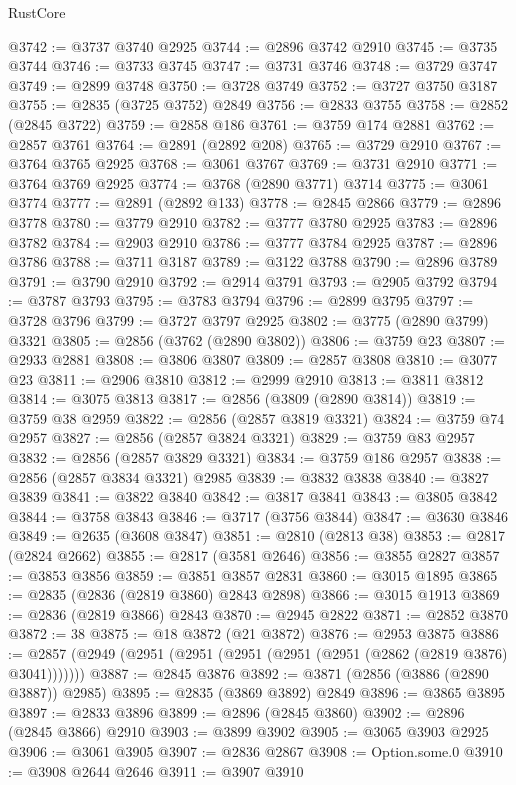 \begin{lexlean}{RustCore}
\begin{coremodule}
@3742 := @3737 @3740 @2925
@3744 := @2896 @3742 @2910
@3745 := @3735 @3744
@3746 := @3733 @3745
@3747 := @3731 @3746
@3748 := @3729 @3747
@3749 := @2899 @3748
@3750 := @3728 @3749
@3752 := @3727 @3750 @3187
@3755 := @2835 (@3725 @3752) @2849
@3756 := @2833 @3755
@3758 := @2852 (@2845 @3722)
@3759 := @2858 @186
@3761 := @3759 @174 @2881
@3762 := @2857 @3761
@3764 := @2891 (@2892 @208)
@3765 := @3729 @2910
@3767 := @3764 @3765 @2925
@3768 := @3061 @3767
@3769 := @3731 @2910
@3771 := @3764 @3769 @2925
@3774 := @3768 (@2890 @3771) @3714
@3775 := @3061 @3774
@3777 := @2891 (@2892 @133)
@3778 := @2845 @2866
@3779 := @2896 @3778
@3780 := @3779 @2910
@3782 := @3777 @3780 @2925
@3783 := @2896 @3782
@3784 := @2903 @2910
@3786 := @3777 @3784 @2925
@3787 := @2896 @3786
@3788 := @3711 @3187
@3789 := @3122 @3788
@3790 := @2896 @3789
@3791 := @3790 @2910
@3792 := @2914 @3791
@3793 := @2905 @3792
@3794 := @3787 @3793
@3795 := @3783 @3794
@3796 := @2899 @3795
@3797 := @3728 @3796
@3799 := @3727 @3797 @2925
@3802 := @3775 (@2890 @3799) @3321
@3805 := @2856 (@3762 (@2890 @3802))
@3806 := @3759 @23
@3807 := @2933 @2881
@3808 := @3806 @3807
@3809 := @2857 @3808
@3810 := @3077 @23
@3811 := @2906 @3810
@3812 := @2999 @2910
@3813 := @3811 @3812
@3814 := @3075 @3813
@3817 := @2856 (@3809 (@2890 @3814))
@3819 := @3759 @38 @2959
@3822 := @2856 (@2857 @3819 @3321)
@3824 := @3759 @74 @2957
@3827 := @2856 (@2857 @3824 @3321)
@3829 := @3759 @83 @2957
@3832 := @2856 (@2857 @3829 @3321)
@3834 := @3759 @186 @2957
@3838 := @2856 (@2857 @3834 @3321) @2985
@3839 := @3832 @3838
@3840 := @3827 @3839
@3841 := @3822 @3840
@3842 := @3817 @3841
@3843 := @3805 @3842
@3844 := @3758 @3843
@3846 := @3717 (@3756 @3844)
@3847 := @3630 @3846
@3849 := @2635 (@3608 @3847)
@3851 := @2810 (@2813 @38)
@3853 := @2817 (@2824 @2662)
@3855 := @2817 (@3581 @2646)
@3856 := @3855 @2827
@3857 := @3853 @3856
@3859 := @3851 @3857 @2831
@3860 := @3015 @1895
@3865 := @2835 (@2836 (@2819 @3860) @2843 @2898)
@3866 := @3015 @1913
@3869 := @2836 (@2819 @3866) @2843
@3870 := @2945 @2822
@3871 := @2852 @3870
@3872 := 38
@3875 := @18 @3872 (@21 @3872)
@3876 := @2953 @3875
@3886 := @2857 (@2949 (@2951 (@2951 (@2951 (@2951 (@2951 (@2862 (@2819 @3876) @3041)))))))
@3887 := @2845 @3876
@3892 := @3871 (@2856 (@3886 (@2890 @3887)) @2985)
@3895 := @2835 (@3869 @3892) @2849
@3896 := @3865 @3895
@3897 := @2833 @3896
@3899 := @2896 (@2845 @3860)
@3902 := @2896 (@2845 @3866) @2910
@3903 := @3899 @3902
@3905 := @3065 @3903 @2925
@3906 := @3061 @3905
@3907 := @2836 @2867
@3908 := Option.some.{0}
@3910 := @3908 @2644 @2646
@3911 := @3907 @3910

\end{coremodule}
\end{lexlean}
